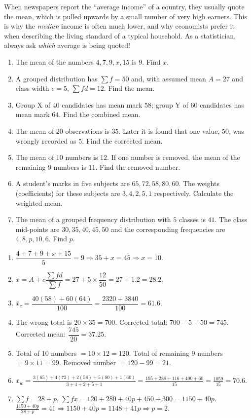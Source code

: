 \documentclass[11pt]{article}
\begin{document}
\begin{savaistu}
When newspapers report the ``average income'' of a country, they usually quote the mean, which is pulled upwards by a small number of very high earners. This is why the \emph{median} income is often much lower, and why economists prefer it when describing the living standard of a typical household. As a statistician, always ask \emph{which} average is being quoted!
\end{savaistu}

\begin{exercice}[Practice]
\begin{enumerate}
\item The mean of the numbers $4, 7, 9, x, 15$ is $9$. Find $x$.
\item A grouped distribution has $\sum f = 50$ and, with assumed mean $A=27$ and class width $c=5$, $\sum fd = 12$. Find the mean.
\item Group X of $40$ candidates has mean mark $58$; group Y of $60$ candidates has mean mark $64$. Find the combined mean.
\item The mean of $20$ observations is $35$. Later it is found that one value, $50$, was wrongly recorded as $5$. Find the corrected mean.
\item The mean of $10$ numbers is $12$. If one number is removed, the mean of the remaining $9$ numbers is $11$. Find the removed number.
\item A student's marks in five subjects are $65, 72, 58, 80, 60$. The weights (coefficients) for these subjects are $3, 4, 2, 5, 1$ respectively. Calculate the weighted mean.
\item The mean of a grouped frequency distribution with $5$ classes is $41$. The class mid-points are $30, 35, 40, 45, 50$ and the corresponding frequencies are $4, 8, p, 10, 6$. Find $p$.
\end{enumerate}
\end{exercice}

\begin{corrige}[Exercise 1]
\begin{enumerate}
\item $\dfrac{4+7+9+x+15}{5}=9 \Rightarrow 35+x=45 \Rightarrow x=10$.
\item $\bar{x}=A+c\dfrac{\sum fd}{\sum f}=27+5\times\dfrac{12}{50}=27+1.2=28.2$.
\item $\bar{x}_c=\dfrac{40(58)+60(64)}{100}=\dfrac{2320+3840}{100}=61.6$.
\item The wrong total is $20\times 35=700$. Corrected total: $700-5+50=745$. Corrected mean: $\dfrac{745}{20}=37.25$.
\item Total of $10$ numbers $= 10 \times 12 = 120$. Total of remaining $9$ numbers $= 9 \times 11 = 99$. Removed number $= 120 - 99 = 21$.
\item $\bar{x}_w = \frac{3(65)+4(72)+2(58)+5(80)+1(60)}{3+4+2+5+1} = \frac{195+288+116+400+60}{15} = \frac{1059}{15} = 70.6$.
\item $\sum f = 28+p$, $\sum fx = 120+280+40p+450+300 = 1150+40p$.
$\frac{1150+40p}{28+p} = 41 \Rightarrow 1150+40p = 1148+41p \Rightarrow p=2$.
\end{enumerate}
\end{corrige}
\end{document}
